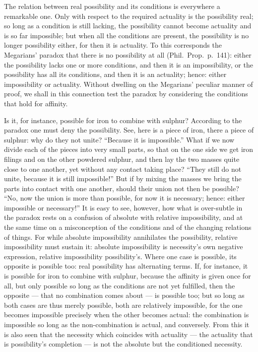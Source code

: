 \documentclass[12pt,a4paper]{book}
\begin{document}
The relation between real possibility and its conditions is everywhere a
remarkable one. Only with respect to the required actuality is the possibility
real; so long as a condition is still lacking, the possibility cannot become
actuality and is so far impossible; but when all the conditions are present,
the possibility is no longer possibility either, for then it is actuality. To
this corresponds the Megarians' paradox that there is no possibility at all
(Phil.\ Prop.\ p.~141): either the possibility lacks one or more conditions,
and then it is an impossibility, or the possibility has all its conditions, and
then it is an actuality; hence: either impossibility or actuality. Without
dwelling on the Megarians' peculiar manner of proof, we shall in this
connection test the paradox by considering the conditions that hold for
affinity.

Is it, for instance, possible for iron to combine with sulphur? According to
the paradox one must deny the possibility. See, here is a piece of iron, there
a piece of sulphur: why do they not unite? ``Because it is impossible.'' What
if we now divide each of the pieces into very small parts, so that on the one
side we get iron filings and on the other powdered sulphur, and then lay the
two masses quite close to one another, yet without any contact taking place?
``They still do not unite, because it is still impossible!'' But if by mixing
the masses we bring the parts into contact with one another, should their union
not then be possible? ``No, now the union is more than possible, for now it is
necessary; hence: either impossible or
necessary!'' It is easy to see, however, how what is over-subtle in the paradox
rests on a confusion of absolute with relative impossibility, and at the same
time on a misconception of the conditions and of the changing relations of
things. For while absolute impossibility annihilates the possibility, relative
impossibility must sustain it: absolute impossibility is necessity's own
negative expression, relative impossibility possibility's. Where one case is
possible, its opposite is possible too: real possibility has alternating terms.
If, for instance, it is possible for iron to combine with sulphur, because the
affinity is given once for all, but only possible so long as the conditions are
not yet fulfilled, then the opposite --- that no combination comes about --- is
possible too; but so long as both cases are thus merely possible, both are
relatively impossible, for the one becomes impossible precisely when the other
becomes actual: the combination is impossible so long as the non-combination is
actual, and conversely. From this it is also seen that the necessity which
coincides with actuality --- the actuality that is possibility's completion ---
is not the absolute but the conditioned necessity.
\end{document}
